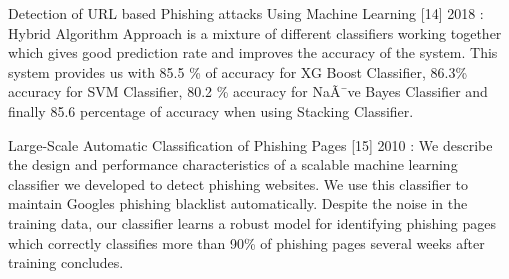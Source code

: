 \hspace{.2cm} Detection of URL based Phishing attacks Using Machine Learning [14] 2018 : Hybrid Algorithm Approach is a mixture of different classifiers working together which gives good prediction rate and improves the accuracy of the system. This system provides us with 85.5 \% of accuracy for XG Boost Classifier, 86.3\% accuracy for SVM Classifier, 80.2 \% accuracy for NaÃ¯ve Bayes Classifier and finally 85.6 percentage of accuracy when using Stacking Classifier.



\hspace{.2cm} Large-Scale Automatic Classification of Phishing Pages 
[15] 2010 : We describe the design and performance characteristics of a scalable machine learning classifier we developed to detect phishing websites. We use this classifier to maintain Googles phishing blacklist automatically. Despite the noise in the training data, our classifier learns a robust model for identifying phishing pages which correctly classifies more than 90\% of phishing pages several weeks after training concludes. 

